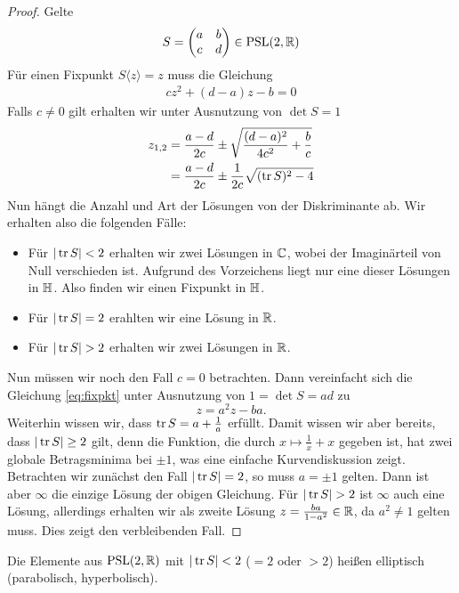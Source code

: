 \begin{proof}
  Gelte
  \[
  S =
  \begin{pmatrix}
    a & b\\
    c & d
  \end{pmatrix} \in \operatorname{PSL}(2, \mathbb{R})
  \]
  Für einen Fixpunkt $S \langle z \rangle = z$ muss die Gleichung
  \begin{align}
    \label{eq:fixpkt}
    c z^2 + (d-a)z - b = 0
  \end{align}
  Falls $c \neq 0$ gilt erhalten wir unter Ausnutzung von $\det S = 1$
  \begin{align*}
    z_{1,2} & = \frac{a-d}{2c} \pm \sqrt{\frac{(d-a)^2}{4c^2} +
      \frac{b}{c}} \\
    & = \frac{a-d}{2c} \pm \frac{1}{2c} \sqrt{(\operatorname{tr} S)^2 - 4}
  \end{align*}
  Nun hängt die Anzahl und Art der Lösungen von der Diskriminante
  ab. Wir erhalten also die folgenden Fälle:
  \begin{itemize}
  \item Für $|\operatorname{tr} S| < 2$ erhalten wir zwei Lösungen in $\mathbb{C}$, wobei
    der Imaginärteil von Null verschieden ist. Aufgrund des
    Vorzeichens liegt nur eine dieser Lösungen in $\mathbb{H}$. Also finden
    wir einen Fixpunkt in $\mathbb{H}$.
  \item Für $|\operatorname{tr} S| = 2$ erahlten wir eine Lösung in $\mathbb{R}$.
  \item Für $|\operatorname{tr} S| > 2$ erhalten wir zwei Lösungen in $\mathbb{R}$.
  \end{itemize}
  Nun müssen wir noch den Fall $c = 0$ betrachten. Dann vereinfacht
  sich die Gleichung \eqref{eq:fixpkt} unter Ausnutzung von $1 = \det
  S = ad$ zu
  \[
  z = a^2 z - ba.
  \]
  Weiterhin wissen wir, dass $\operatorname{tr} S = a + \frac{1}{a}$ erfüllt. Damit
  wissen wir aber bereits, dass $|\operatorname{tr} S| \geq 2$ gilt, denn die
  Funktion, die durch $x \mapsto \frac{1}{x} + x$ gegeben ist, hat
  zwei globale Betragsminima bei $\pm 1$, was eine einfache
  Kurvendiskussion zeigt. Betrachten wir zunächst den Fall $|\operatorname{tr} S| =
  2$, so muss $a = \pm 1$ gelten. Dann ist aber $\infty$ die einzige
  Lösung der obigen Gleichung. Für $|\operatorname{tr} S| > 2$ ist $\infty$ auch
  eine Lösung, allerdings erhalten wir als zweite Lösung $z =
  \frac{ba}{1-a^2} \in \mathbb{R}$, da $a^2 \neq 1$ gelten muss. Dies zeigt
  den verbleibenden Fall.
\end{proof}

\begin{defin}
  Die Elemente aus $\operatorname{PSL}(2,\mathbb{R})$ mit $|\operatorname{tr} S| < 2$ ($ = 2$ oder $ > 2$)
  heißen elliptisch (parabolisch, hyperbolisch).
\end{defin}


